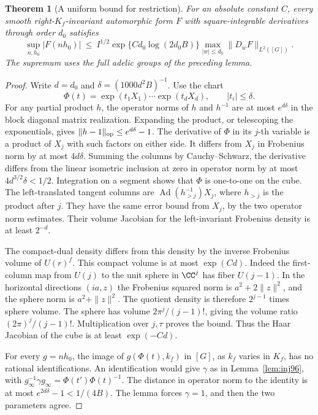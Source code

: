 \documentclass[a4paper,11pt]{article}
\newtheorem{theorem}[proposition]{Theorem}
\theoremstyle{definition}
\theoremstyle{remark}
\numberwithin{equation}{section}
\begin{document}
\begin{theorem}[A uniform bound for restriction]\label{thm:rest96}
For an absolute constant \(C\), every smooth right-\(K_f\)-invariant
automorphic form \(F\) with square-integrable derivatives through
order \(d_0\) satisfies
\begin{equation}
  \sup_{n,h_0}|F(nh_0)|
  \ \le\ I^{1/2}\exp\{C d_0\log(2d_0 B)\}
       \max_{|w|\le d_0}\|D_wF\|_{L^2([G])}.                 \label{eq:rest96}
\end{equation}
The supremum uses the full adelic groups of the preceding lemma.
\end{theorem}
\begin{proof}
Write \(d=d_0\) and \(\delta=(1000d^2 B)^{-1}\). Use the chart
\[
          \Phi(t)=\exp(t_1X_1)\cdots\exp(t_dX_d),
                        \qquad |t_i|\le\delta .
\]
For any partial product \(h\), the operator norms of \(h\) and
\(h^{-1}\) are at most \(e^{d\delta}\) in the block diagonal
matrix realization. Expanding the product, or telescoping the
exponentials, gives \(\|h-1\|_{\rm op}\le e^{d\delta}-1\).
The derivative of \(\Phi\) in its \(j\)-th variable is a product
of \(X_j\) with such factors on either side. It differs from
\(X_j\) in Frobenius norm by at most \(4d\delta\). Summing the
columns by Cauchy--Schwarz, the derivative differs from the
linear isometric inclusion at zero in operator norm by at most
\(4d^{3/2}\delta<1/2\). Integration on a segment shows that
\(\Phi\) is one-to-one on the cube. The left-translated tangent
columns are \(\operatorname{Ad}(h_{>j}^{-1})X_j\), where \(h_{>j}\)
is the product after \(j\). They have the same error bound from
\(X_j\), by the two operator norm estimates. Their volume
Jacobian for the left-invariant Frobenius density is at least
\(2^{-d}\).

The compact-dual density differs from this density by the inverse
Frobenius volume of \(U(r)^f\). This compact volume is at most
\(\exp(Cd)\). Indeed the first-column map from \(U(j)\) to the
unit sphere in \(\CC^j\) has fiber \(U(j-1)\). In the horizontal
directions \((ia,z)\) the Frobenius squared norm is
\(a^2+2\|z\|^2\), and the sphere norm is \(a^2+\|z\|^2\).
The quotient density is therefore \(2^{j-1}\) times sphere
volume. The sphere has volume \(2\pi^j/(j-1)!\), giving the
volume ratio \((2\pi)^j/(j-1)!\). Multiplication over \(j,\tau\)
proves the bound. Thus the Haar Jacobian of the cube is at
least \(\exp(-Cd)\).

For every \(g=nh_0\), the image of \(g(\Phi(t),k_f)\) in \([G]\),
as \(k_f\) varies in \(K_f\), has no rational identifications.
An identification would give \(\gamma\) as in Lemma~\ref{lem:inj96},
with \(g_\infty^{-1}\gamma g_\infty=\Phi(t')\Phi(t)^{-1}\).
The distance in operator norm to the identity is at most
\(e^{2d\delta}-1<1/(4B)\). The lemma forces \(\gamma=1\), and
then the two parameters agree.


\end{proof}
\end{document}

